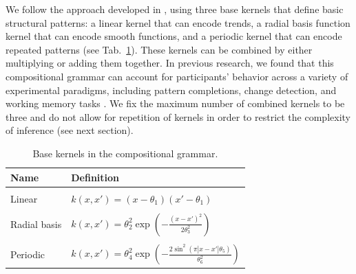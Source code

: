 \documentclass[a4paper,man, floatsintext, natbib]{apa6}
\begin{document}
We follow the approach developed in \citet{schulz2017compositional}, using three base kernels that define basic structural patterns: a linear kernel that can encode trends, a radial basis function kernel that can encode smooth functions, and a periodic kernel that can encode repeated patterns (see Tab.~\ref{tab:basekernels}). These kernels can be combined by either multiplying or adding them together. In previous research, we found that this compositional grammar can account for participants' behavior across a variety of experimental paradigms, including pattern completions, change detection, and working memory tasks \citep{schulz2017compositional}. We fix the maximum number of combined kernels to be three and do not allow for repetition of kernels in order to restrict the complexity of inference (see next section).

\begin{table}[h!]
\footnotesize
\centering
\caption{Base kernels in the compositional grammar.}
\label{tab:basekernels}
 \begin{tabular}{l|l}
\bf{Name} & \bf{Definition}\\
\hline\\
Linear & $k(x,x')=(x-\theta_1)(x'-\theta_1)$\\ \\
Radial basis & $k(x,x')=\theta_2^2\exp\left(-\frac{(x-x')^2}{2\theta_3^2}\right)$ \\\\
Periodic&$k(x,x')=\theta_4^2\exp\left(-\frac{2\sin^2(\pi|x-x'|\theta_5)}{\theta_6^2}\right)$
\end{tabular}
\end{table}
\end{document}
